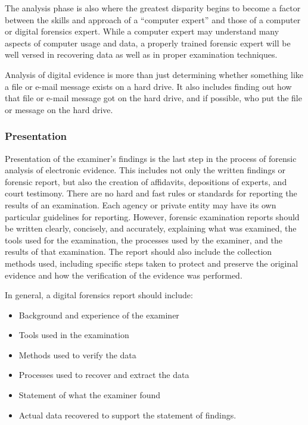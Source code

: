 The analysis phase is also where the greatest disparity begins to become a factor
between the skills and approach of a “computer expert” and those of a computer or
digital forensics expert. While a computer expert may understand many aspects of
computer usage and data, a properly trained forensic expert will be well versed in
recovering data as well as in proper examination techniques.

Analysis of digital evidence is more than just determining whether something
like a file or e-mail message exists on a hard drive. It also includes finding out how
that file or e-mail message got on the hard drive, and if possible, who put the file or
message on the hard drive.

\subsubsection{Presentation}

Presentation of the examiner’s findings is the last step in the process of forensic
analysis of electronic evidence. This includes not only the written findings or forensic
report, but also the creation of affidavits, depositions of experts, and court testimony.
There are no hard and fast rules or standards for reporting the results of an
examination. Each agency or private entity may have its own particular guidelines
for reporting. However, forensic examination reports should be written clearly, concisely,
and accurately, explaining what was examined, the tools used for the examination,
the processes used by the examiner, and the results of that examination.
The report should also include the collection methods used, including specific steps
taken to protect and preserve the original evidence and how the verification of the
evidence was performed.

In general, a digital forensics report should include:

\begin{itemize}
\item Background and experience of the examiner
\item Tools used in the examination
\item Methods used to verify the data
\item Processes used to recover and extract the data
\item Statement of what the examiner found
\item Actual data recovered to support the statement of findings.
\end{itemize}


